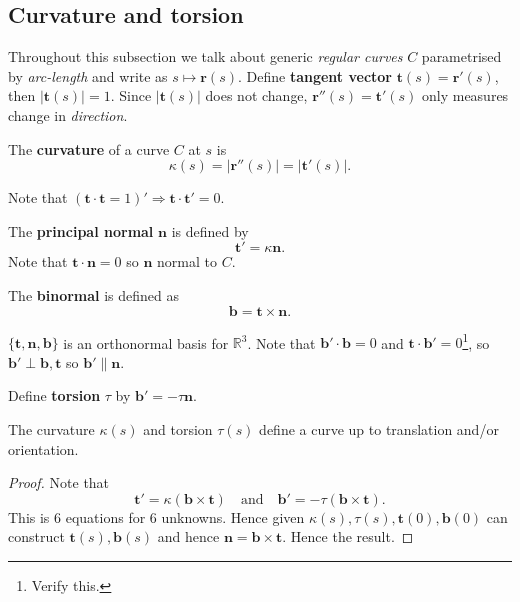 \subsection{Curvature and torsion}
Throughout this subsection we talk about generic \textit{regular curves} $C$ parametrised by \textit{arc-length} and write as $ s \mapsto \mathbf{r}(s) $. Define \textbf{tangent vector} $ \mathbf{t}(s)=\mathbf{r}'(s) $, then $ |\mathbf{t}(s)|=1 $. Since $ |\mathbf{t}(s)| $ does not change, $ \mathbf{r}''(s)=\mathbf{t}'(s) $ only measures change in \textit{direction}.

\begin{definition}[Curvature]
    The \textbf{curvature} of a curve $C$ at $s$ is 
    \[
        \kappa(s) = \left| \mathbf{r}''(s) \right| = \left| \mathbf{t}'(s) \right|.
    \]
\end{definition}

Note that $ (\mathbf{t} \cdot \mathbf{t} =1)' \Rightarrow \mathbf{t} \cdot \mathbf{t}'=0 $.
\begin{definition}
    The \textbf{principal normal} $\mathbf{n}$ is defined by 
    \[
        \mathbf{t}'=\kappa \mathbf{n}.
    \]
    Note that $ \mathbf{t} \cdot \mathbf{n}=0 $ so $\mathbf{n}$ normal to $C$.
\end{definition}

\begin{definition}[Binormal]
    The \textbf{binormal} is defined as 
    \[
        \mathbf{b} = \mathbf{t} \times \mathbf{n}.
    \]
\end{definition}

$ \{\mathbf{t},\mathbf{n},\mathbf{b}\} $ is an orthonormal basis for $ \mathbb{R}^{3} $. Note that $ \mathbf{b}' \cdot \mathbf{b}=0 $ and $ \mathbf{t} \cdot \mathbf{b}'=0 $\footnote{Verify this.}, so $ \mathbf{b}' \perp \mathbf{b},\mathbf{t} $ so $ \mathbf{b}' \parallel \mathbf{n} $.

\begin{definition}[Torsion]
    Define \textbf{torsion} $ \tau $ by $ \mathbf{b}' = -\tau \mathbf{n} $.
\end{definition}

\begin{proposition}
    The curvature $ \kappa(s) $ and torsion $ \tau(s)$ define a curve up to translation and/or orientation.
\end{proposition}
\begin{proof}
    Note that
    \[
        \mathbf{t}'=\kappa (\mathbf{b}\times \mathbf{t})\quad \text{and}\quad \mathbf{b}'=-\tau(\mathbf{b}\times \mathbf{t}).
    \]
    This is 6 equations for 6 unknowns. Hence given $ \kappa(s),\tau(s),\mathbf{t}(0),\mathbf{b}(0) $ can construct $ \mathbf{t}(s),\mathbf{b}(s) $ and hence $\mathbf{n}=\mathbf{b}\times \mathbf{t}$. Hence the result.
\end{proof}

